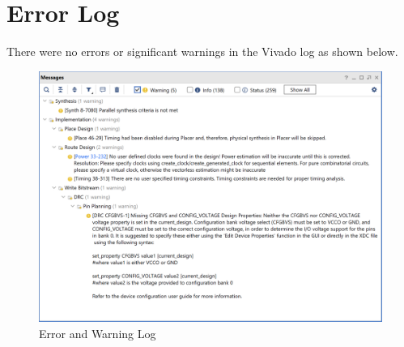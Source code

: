 \documentclass[12pt]{article}
\begin{document}
\newpage

\section{Error Log}

There were no errors or significant warnings in the Vivado log as shown below.

\begin{figure}[h]
    \centering
    \includegraphics[width=.8\textwidth]{Figures/CPE 133 Lab 1 Warning Log.png}
    \caption{Error and Warning Log}
    \label{fig:warninglog}
\end{figure}
\end{document}
